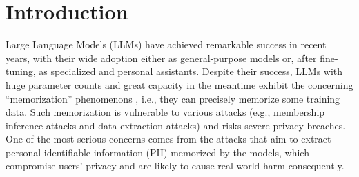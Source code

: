 \section{Introduction\label{Introduction}}
Large Language Models (LLMs) \citep{touvron2023llama,achiam2023gpt,team2023gemini, dubey2024llama} have achieved remarkable success in recent years, with their wide adoption either as general-purpose models or, after fine-tuning, as specialized and personal assistants.
Despite their success, LLMs with huge parameter counts and great capacity in the meantime exhibit the concerning ``memorization'' phenomenons \citep{carlini2019secret,carlini2021extracting}, i.e., they can precisely memorize some training data.
Such memorization is vulnerable to various attacks (e.g., membership inference attacks and data extraction attacks) and risks severe privacy breaches.
One of the most serious concerns comes from the attacks that aim to extract personal identifiable information (PII) memorized by the models, which compromise users' privacy and are likely to cause real-world harm consequently. 
\begin{comment}
There are various types of PII, including phone numbers, physical addresses, credit card numbers, Social Security Numbers (SSN), and personal email addresses. Structurally, phone numbers, credit card numbers, and SSNs are similar as they primarily consist of numerical sequences. In contrast, physical addresses and personal email addresses are alike in that they typically incorporate both numbers and words.
\end{comment}

\begin{comment}
\begin{figure*}[t!]
\centering
  \texttt{[image: ./images/selling\_point\_real\_number.png]}
  \caption{Trade-off between current methods: Model performance is measured in terms of average perplexity on a logarithmic scale, while the Risk score pertains to the Phone risk score. APA represents our method, Active Privacy Amnesia.}
  \label{current_method_trade_off}
\end{figure*}
\end{comment}


\begin{comment}
\begin{wrapfigure}{r}{0.5\textwidth}
    \centering
    \texttt{[image: ./images/selling\_point\_real\_number.png]}
    \caption{Trade-off between current methods: Model performance is measured in terms of average perplexity on a logarithmic scale, while the Risk score pertains to the Phone risk score. APA represents our method, Active Privacy Amnesia.}
    \label{current_method_trade_off}
\end{wrapfigure}
\end{comment}


